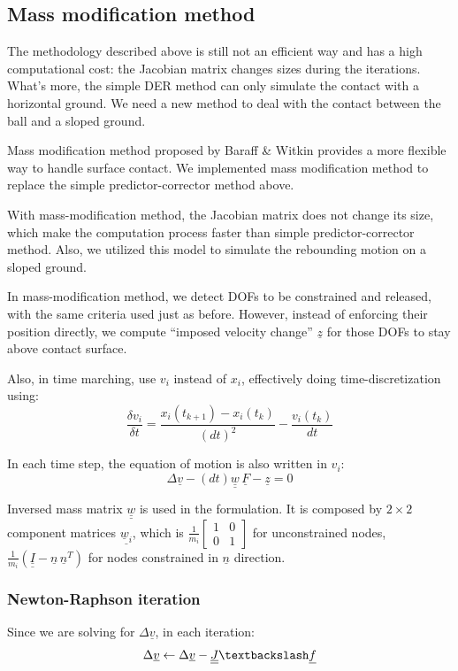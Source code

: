 \documentclass[letterpaper,9pt,twocolumn]{extarticle}
\begin{document}
	\subsection{Mass modification method}		
		The methodology described above is still not an efficient way and has a high computational cost: the Jacobian matrix changes sizes during the iterations. What's more, the simple DER method can only simulate the contact with a horizontal ground. We need a new method to deal with the contact between the ball and a sloped ground.
		
		Mass modification method proposed by Baraff \& Witkin \cite{Baraff98} provides a more flexible way to handle surface contact. We implemented mass modification method to replace the simple predictor-corrector method above.
		
		With mass-modification method, the Jacobian matrix does not change its size, which make the computation process faster than simple predictor-corrector method. Also, we utilized this model to simulate the rebounding motion on a sloped ground.
		
		In mass-modification method, we detect DOFs to be constrained and released, with the same criteria used just as before. However, instead of enforcing their position directly, we compute ``imposed velocity change'' $\underline z$ for those DOFs to stay above contact surface.
		
		Also, in time marching, use $v_i$ instead of $x_i$, effectively doing time-discretization using:
		$$\frac{\delta v_i}{\delta t} = \frac{x_i(t_{k+1}) - x_i(t_k)}{(dt)^2} - \frac{v_i(t_k)}{dt}$$
	
		In each time step, the equation of motion is also written in $v_i$: 
		$$\Delta \underline v - (dt) \underline{\underline w}\,\underline F - \underline z = 0$$ 
		
		Inversed mass matrix $\underline{\underline w}$ is used in the formulation. It is composed by $2\times2$ component matrices $\underline{\underline w_i}$, which is $\frac1{m_i}\begin{bmatrix}1 & 0\\0 & 1\end{bmatrix}$ for unconstrained nodes, $\frac1{m_i}(\underline{\underline I} - \underline n\,\underline n^T)$ for nodes constrained in $\underline n$ direction.
		\subsubsection{Newton-Raphson iteration}
			Since we are solving for $\Delta \underline v$, in each iteration:
			$$\Delta \underline v \gets \Delta \underline v - \underline{\underline J} \textbackslash \underline f$$
			
\end{document}
